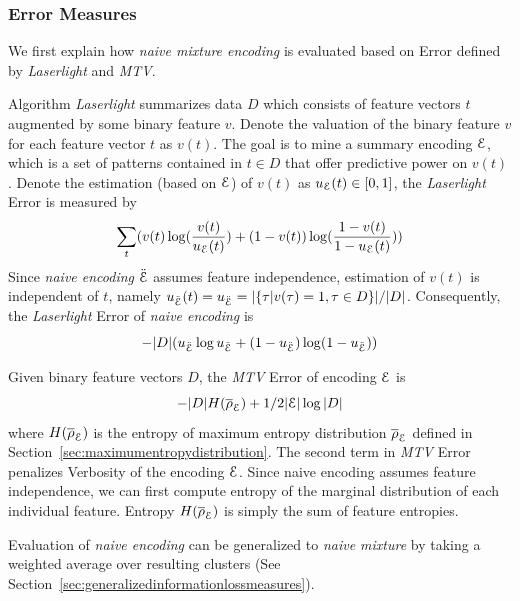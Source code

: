 \subsubsection{Error Measures}
We first explain how \textit{naive mixture encoding} is evaluated based on Error defined by \textit{Laserlight} and \textit{MTV}.

Algorithm \textit{Laserlight} summarizes data $D$ which consists of feature vectors $t$ augmented by some binary feature $v$.
Denote the valuation of the binary feature $v$ for each feature vector $t$ as $v(t)$. 
The goal is to mine a summary encoding $\mathcal E$, which is a set of patterns contained in $t\in D$ that offer predictive power on $v(t)$.
Denote the estimation (based on $\mathcal E$) of $v(t)$ as $u_{\mathcal E}(t)\in [0,1]$, the \textit{Laserlight} Error is measured by $$\sum_t ( v(t)\log(\frac{v(t)}{u_{\mathcal E}(t)})+(1-v(t))\log(\frac{1-v(t)}{1-u_{\mathcal E}(t)}) )$$
Since \textit{naive encoding} $\ddot{\mathcal E}$  assumes feature independence, estimation of $v(t)$ is independent of $t$, namely $u_{\ddot{\mathcal E}}(t)=u_{\ddot{\mathcal E}}=|\{\tau|v(\tau)=1,\tau\in D\}|/|D|$.
Consequently, the \textit{Laserlight} Error of \textit{naive encoding} is $$-|D|(u_{\ddot{\mathcal E}}\log u_{\ddot{\mathcal E}}+(1-u_{\ddot{\mathcal E}})\log (1-u_{\ddot{\mathcal E}}) )$$

Given binary feature vectors $D$, the \textit{MTV} Error of encoding $\mathcal E$ is $$-|D|H(\overline{\rho}_\mathcal E)+1/2|\mathcal E|\log|D|$$ where $H(\overline{\rho}_\mathcal E)$ is the entropy of maximum entropy distribution $\overline{\rho}_\mathcal E$ defined in Section~\ref{sec:maximumentropydistribution}.
The second term in \textit{MTV} Error penalizes Verbosity of the encoding $\mathcal E$.
Since naive encoding assumes feature independence, we can first compute entropy of the marginal distribution of each individual feature.
Entropy $H(\overline{\rho}_\mathcal E)$ is simply the sum of feature entropies.

Evaluation of \textit{naive encoding} can be generalized to \textit{naive mixture} by taking a weighted average over resulting clusters (See Section~\ref{sec:generalizedinformationlossmeasures}).

